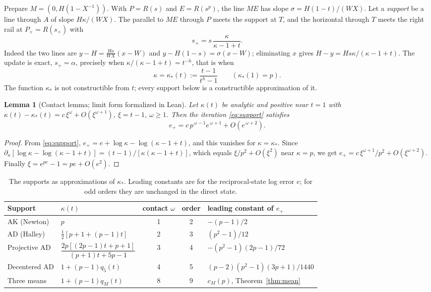 \documentclass[10pt,a4paper]{article}
\theoremstyle{plain}
\newtheorem{lemma}[theorem]{Lemma}
\theoremstyle{remark}
\numberwithin{equation}{section}
\begin{document}
Prepare $M=(0,H(1-X^{-1}))$. With $P=R(s)$ and $E=R(s^{p})$, the line $ME$ has slope
$\sigma=H(1-t)/(WX)$. Let a \emph{support} be a line through $A$ of slope $H\kappa/(WX)$. The parallel
to $ME$ through $P$ meets the support at $T$, and the horizontal through $T$ meets the right rail at
$P_+=R(s_+)$ with
\begin{equation}\label{eq:support}
s_+=s\,\frac{\kappa}{\kappa-1+t}.
\end{equation}
Indeed the two lines are $y-H=\tfrac{H\kappa}{WX}(x-W)$ and $y-H(1-s)=\sigma(x-W)$; eliminating $x$
gives $H-y=Hs\kappa/(\kappa-1+t)$. The update is exact, $s_+=\alpha$, precisely when
$\kappa/(\kappa-1+t)=t^{-h}$, that is when
\begin{equation}\label{eq:kstar}
\kappa=\kappa_*(t):=\frac{t-1}{t^{h}-1}\qquad(\kappa_*(1)=p).
\end{equation}
The function $\kappa_*$ is not constructible from $t$; every support below is a constructible
approximation of it.

\begin{lemma}[Contact lemma; limit form formalized in Lean]\label{lem:contact}
Let $\kappa(t)$ be analytic and positive near $t=1$ with
$\kappa(t)-\kappa_*(t)=c\,\xi^{\omega}+O(\xi^{\omega+1})$, $\xi=t-1$, $\omega\ge1$. Then the iteration
\eqref{eq:support} satisfies
\[ e_+=c\,p^{\,\omega-1}e^{\,\omega+1}+O(e^{\,\omega+2}). \]
\end{lemma}
\begin{proof}
From \eqref{eq:support}, $e_+=e+\log\kappa-\log(\kappa-1+t)$, and this vanishes for
$\kappa=\kappa_*$. Since $\partial_\kappa[\log\kappa-\log(\kappa-1+t)]=(t-1)/[\kappa(\kappa-1+t)]$,
which equals $\xi/p^{2}+O(\xi^{2})$ near $\kappa=p$, we get
$e_+=c\,\xi^{\omega+1}/p^{2}+O(\xi^{\omega+2})$. Finally $\xi=e^{pe}-1=pe+O(e^{2})$.
\end{proof}

\begin{table}[h]
\centering\small
\caption{The supports as approximations of $\kappa_*$. Leading constants are for the reciprocal-state
log error $e$; for odd orders they are unchanged in the direct state.}\label{tab:supports}
\begin{tabular}{@{}llccl@{}}
\toprule
Support & $\kappa(t)$ & contact $\omega$ & order & leading constant of $e_+$\\
\midrule
AK (Newton) & $p$ & 1 & 2 & $-(p-1)/2$\\[2pt]
AD (Halley) & $\tfrac12[p+1+(p-1)t]$ & 2 & 3 & $(p^{2}-1)/12$\\[2pt]
Projective AD & $\dfrac{2p[(2p-1)t+p+1]}{(p+1)t+5p-1}$ & 3 & 4 & $-(p^{2}-1)(2p-1)/72$\\[6pt]
Decentered AD & $1+(p-1)q_5(t)$ & 4 & 5 & $(p-2)(p^{2}-1)(3p+1)/1440$\\[2pt]
Three means & $1+(p-1)q_M(t)$ & 8 & 9 & $c_M(p)$, Theorem~\ref{thm:mean}\\
\bottomrule
\end{tabular}
\end{table}
\end{document}
